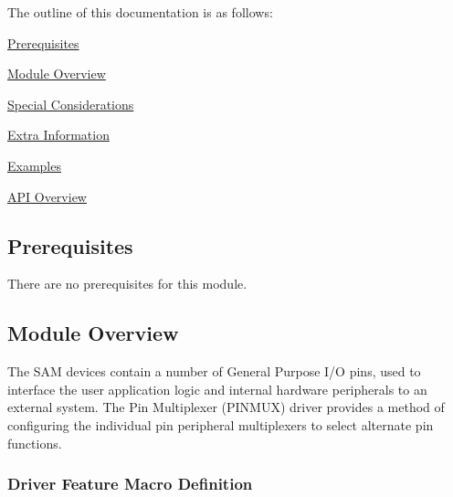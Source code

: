 The outline of this documentation is as follows\+:
\begin{DoxyItemize}
\item \hyperlink{group__asfdoc__sam0__system__pinmux__group_asfdoc_sam0_system_pinmux_prerequisites}{Prerequisites}
\item \hyperlink{group__asfdoc__sam0__system__pinmux__group_asfdoc_sam0_system_pinmux_module_overview}{Module Overview}
\item \hyperlink{group__asfdoc__sam0__system__pinmux__group_asfdoc_sam0_system_pinmux_special_considerations}{Special Considerations}
\item \hyperlink{group__asfdoc__sam0__system__pinmux__group_asfdoc_sam0_system_pinmux_extra_info}{Extra Information}
\item \hyperlink{group__asfdoc__sam0__system__pinmux__group_asfdoc_sam0_system_pinmux_examples}{Examples}
\item \hyperlink{group__asfdoc__sam0__system__pinmux__group_asfdoc_sam0_system_pinmux_api_overview}{A\+P\+I Overview}
\end{DoxyItemize}\hypertarget{group__asfdoc__sam0__system__pinmux__group_asfdoc_sam0_system_pinmux_prerequisites}{}\subsection{Prerequisites}\label{group__asfdoc__sam0__system__pinmux__group_asfdoc_sam0_system_pinmux_prerequisites}
There are no prerequisites for this module.\hypertarget{group__asfdoc__sam0__system__pinmux__group_asfdoc_sam0_system_pinmux_module_overview}{}\subsection{Module Overview}\label{group__asfdoc__sam0__system__pinmux__group_asfdoc_sam0_system_pinmux_module_overview}
The S\+A\+M devices contain a number of General Purpose I/\+O pins, used to interface the user application logic and internal hardware peripherals to an external system. The Pin Multiplexer (P\+I\+N\+M\+U\+X) driver provides a method of configuring the individual pin peripheral multiplexers to select alternate pin functions.\hypertarget{group__asfdoc__sam0__system__pinmux__group_asfdoc_sam0_system_pinmux_features}{}\subsubsection{Driver Feature Macro Definition}\label{group__asfdoc__sam0__system__pinmux__group_asfdoc_sam0_system_pinmux_features}
